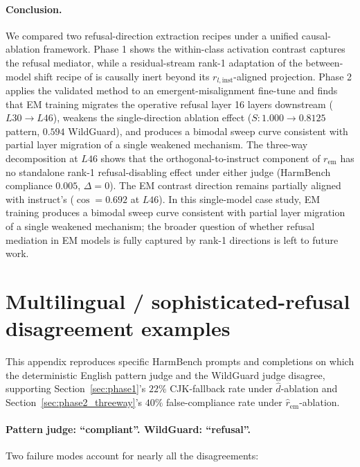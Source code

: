 \documentclass{article}
\newcommand{\rem}{r_{\mathrm{em}}}
\begin{document}
\paragraph{Conclusion.} We compared two refusal-direction extraction
recipes under a unified causal-ablation framework. Phase 1 shows the within-class activation contrast captures the refusal 
mediator, while a residual-stream rank-1 adaptation of the between-model 
shift recipe of \citet{giordani2025reemergent} is causally inert beyond 
its $r_{l,\text{inst}}$-aligned projection. Phase 2 applies the validated method
to an emergent-misalignment fine-tune and finds that EM training
migrates the operative refusal layer 16 layers downstream
($L30 \to L46$), weakens the single-direction ablation effect
($S: 1.000 \to 0.8125$ pattern, $0.594$ WildGuard), and produces a
bimodal sweep curve consistent with partial layer migration of a single weakened mechanism. The three-way
decomposition at $L46$ shows that the orthogonal-to-instruct
component of $\rem$ has no standalone rank-1 refusal-disabling
effect under either judge (HarmBench compliance $0.005$,
$\Delta=0$). The EM contrast direction remains partially aligned
with instruct's ($\cos = 0.692$ at $L46$). In this single-model
case study, EM training produces a bimodal sweep curve consistent with partial layer migration of a single weakened mechanism; the broader
question of whether refusal mediation in EM models is fully
captured by rank-1 directions is left to future work.




\appendix
\section{Multilingual / sophisticated-refusal disagreement examples}
\label{app:multilingual}

This appendix reproduces specific HarmBench prompts and completions
on which the deterministic English pattern judge and the WildGuard judge disagree, supporting
Section~\ref{sec:phase1}'s $22\%$ CJK-fallback rate under
$\hat{d}$-ablation and Section~\ref{sec:phase2_threeway}'s $40\%$
false-compliance rate under $\hat{r}_{\mathrm{em}}$-ablation.

\paragraph{Pattern judge: ``compliant''. WildGuard: ``refusal''.}
Two failure modes account for nearly all the disagreements:
\end{document}
